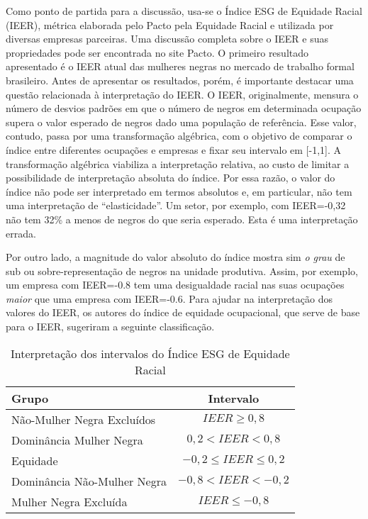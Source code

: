 \documentclass[12pt]{article}
\begin{document}
\par Como ponto de partida para a discussão, usa-se o Índice ESG de Equidade Racial (IEER), métrica elaborada pelo Pacto pela Equidade Racial e utilizada por diversas empresas parceiras. Uma discussão completa sobre o IEER e suas propriedades pode ser encontrada no site Pacto. O primeiro resultado apresentado é o IEER atual das mulheres negras no mercado de trabalho formal brasileiro. Antes de apresentar os resultados, porém, é importante destacar uma questão relacionada à interpretação do IEER. O IEER, originalmente, mensura o número de desvios padrões em que o número de negros em determinada ocupação supera o valor esperado de negros dado uma população de referência. Esse valor, contudo, passa por uma transformação algébrica, com o objetivo de comparar o índice entre diferentes ocupações e empresas e fixar seu intervalo em [-1,1]. A transformação algébrica viabiliza a interpretação relativa, ao custo de limitar a possibilidade de interpretação absoluta do índice. Por essa razão, o valor do índice não pode ser interpretado em termos absolutos e, em particular, não tem uma interpretação de \enquote{elasticidade}. Um setor, por exemplo, com IEER=-0,32 não tem 32\% a menos de negros do que seria esperado. Esta é uma interpretação errada.

\par Por outro lado, a magnitude do valor absoluto do índice mostra sim \textit{o grau} de sub ou sobre-representação de negros na unidade produtiva. Assim, por exemplo, um empresa com IEER=-0.8 tem uma desigualdade racial nas suas ocupações \textit{maior} que uma empresa com IEER=-0.6. Para ajudar na interpretação dos valores do IEER, os autores do índice de equidade ocupacional, que serve de base para o IEER, sugeriram a seguinte classificação.\autocite{ransom2001one}

\begin{table}[htb!]
\centering
\caption{Interpretação dos intervalos do Índice ESG de Equidade Racial}
\begin{tabular}{lc}
\hline
Grupo             & Intervalo                 \\ \hline
Não-Mulher Negra Excluídos & $IEER \geq 0, 8 $               \\
Dominância Mulher Negra  & $0,2 < IEER < 0,8$   \\
Equidade          & $-0,2\leq IEER \leq 0,2$  \\
Dominância Não-Mulher Negra & $-0,8 < IEER < -0,2$ \\
Mulher Negra Excluída  & $IEER \leq -0,8$        \\ \hline
\end{tabular}
\end{table}
\end{document}
